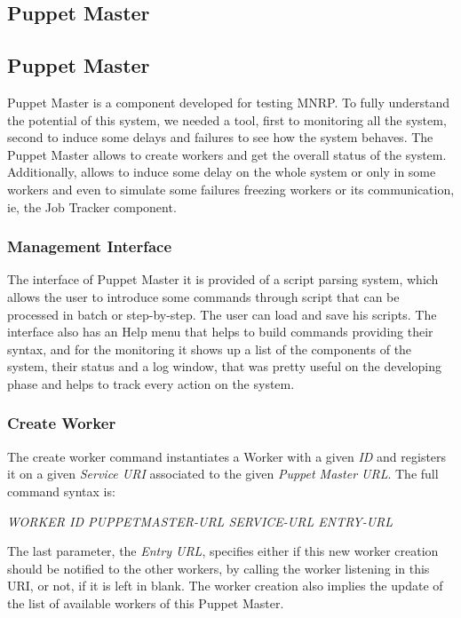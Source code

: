 \documentclass[times, 10pt,twocolumn]{article}
\begin{document}
      \subsection{Puppet Master}

	    	\subsection{Puppet Master}
		      Puppet Master is a component developed for testing \ac{MNRP}. To fully understand the potential of this system, we needed a tool, first to monitoring all the system, second to induce some delays and failures to see how the system behaves. The Puppet Master allows to create workers and get the overall status of the system. Additionally, allows to induce some delay on the whole system or only in some workers and even to simulate some failures freezing workers or its communication, ie, the Job Tracker component.
          \subsubsection{Management Interface}
          The interface of Puppet Master it is provided of a script parsing system, which allows the user to introduce some commands through script that can be processed in batch or step-by-step. The user can load and save his scripts. The interface also has an Help menu that helps to build commands providing their syntax, and for the monitoring it shows up a list of the components of the system, their status and a log window, that was pretty useful on the developing phase and helps to track every action on the system.
          \subsubsection{Create Worker}
          The create worker command instantiates a Worker with a given \emph{ID} and registers it on a given \emph{Service URI} associated to the given \emph{Puppet Master URL}. The full command syntax is:

          \emph{WORKER ID PUPPETMASTER-URL SERVICE-URL ENTRY-URL}

          The last parameter, the \emph{Entry URL}, specifies either if this new worker creation should be notified to the other workers, by calling the worker listening in this URI, or not, if it is left in blank.
          The worker creation also implies the update of the list of available workers of this Puppet Master.
\end{document}
